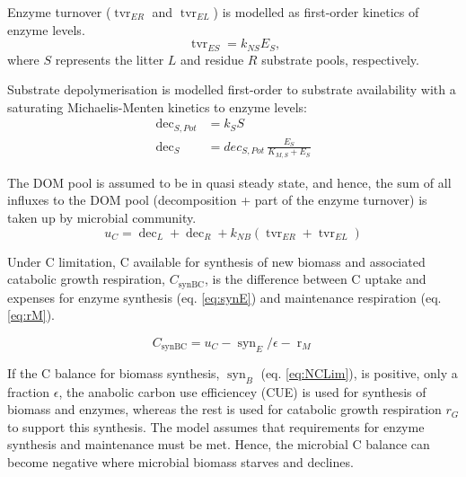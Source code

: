 Enzyme turnover ($\operatorname{tvr}_{ER}$ and $\operatorname{tvr}_{EL}$) is
modelled as first-order kinetics of enzyme levels.
\begin{equation}
\label{eq:tvrE}
\operatorname{tvr}_{ES} = k_{NS} E_S \text{,}
\end{equation}
where $S$ represents the litter $L$ and residue $R$ substrate pools, respectively.  

% 
Substrate depolymerisation is modelled first-order to substrate
availability with a saturating Michaelis-Menten kinetics to enzyme levels:
\begin{subequations}
\label{eq:dec}
\begin{align}
\operatorname{dec}_{S,Pot} &= k_S S
\\ 
\operatorname{dec}_S &= dec_{S,Pot} \, \frac{E_S}{K_{M,S} + E_S}
\end{align}
\end{subequations}
 
The DOM pool is assumed to be in quasi steady state, and hence, the sum of all
influxes to the DOM pool (decomposition + part of the enzyme turnover) is taken
up by microbial community.
\begin{equation}
\label{eq:uC}
u_C = \operatorname{dec}_L + \operatorname{dec}_R +  k_{NB}
(\operatorname{tvr}_{ER} + \operatorname{tvr}_{EL})
\end{equation}

Under C limitation, C available for synthesis of new biomass and
associated catabolic growth respiration, $C_{\operatorname{synBC}}$, is the
difference between C uptake and expenses for enzyme synthesis (eq.
\ref{eq:synE}) and maintenance respiration (eq.
\ref{eq:rM}).

\begin{equation}
\label{eq:synBC} 
C_{\operatorname{synBC}} = u_C -
\operatorname{syn}_E/\epsilon - \operatorname{r}_{M}
\end{equation}

If the C balance for biomass synthesis, $\operatorname{syn}_B$ (eq.
\ref{eq:NCLim}), is positive, only a fraction $\epsilon$, the anabolic
carbon use efficiencey (CUE) is used for synthesis of biomass and enzymes,
whereas the rest is used for catabolic growth respiration $r_G$ to support this
synthesis.
The model assumes that requirements for enzyme synthesis and maintenance must be
met. Hence, the microbial C balance can become negative where microbial biomass starves
and declines.

